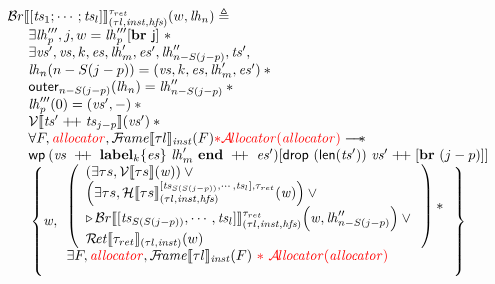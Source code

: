 \documentclass{standalone}
\begin{document}
\[
\begin{array}{l}
  \BRvalid \llbracket [\V{ts}_1; \cdots; \V{ts}_l] \rrbracket_{(\tau l, \V{inst}, \V{hfs})}^{\tau_{ret}}(w,\V{lh}_n) \triangleq
\\
  \quad
  \begin{array}{l}
    \exists \V{lh}'''_{p},j, w = \V{lh}'''_{p}[\K{\textbf{br }j}]~ \ast
  \\
    \exists \V{vs}',\V{vs}, k, \V{es}, \V{lh}'_m, \V{es}', \V{lh}''_{n - S(j - p)}, \V{ts}',
  \\
    \V{lh}_n(n - S(j - p)) = (\V{vs},k,\V{es},\V{lh}'_m,\V{es}') \ast {}
  \\
    \K{outer}_{n - S(j - p)}(\V{lh}_n) = \V{lh}''_{n - S(j - p)} \ast {}
  \\
    \V{lh}'''_p(0) = (\V{vs}',-) \ast {}
  \\
    \Vvalid\llbracket \V{ts}' \app \V{ts}_{j - p} \rrbracket(\V{vs}') \ast {}
  \\
    \forall F, \rr{\V{allocator}}, \FRvalid\llbracket \tau l \rrbracket_{\V{inst}}(F) \rr{\ast{} \Avalid(\V{allocator})} \wand
  \\
    \wprectxml{\V{vs}}{k}{\V{es}}{\V{lh}_{m}'}{\V{es'}}{\K{drop}~(\K{len}(\V{ts}'))~\V{vs}' \app [\KK{br}~(j - p)]}
	{\V{w},
        \begin{array}{l}
          \left(
          \begin{array}{l}
          (\exists \tau s, \Vvalid \llbracket \tau s \rrbracket(\V{w})) \vee {} \\
          \left( \exists \tau s, \Hvalid \llbracket \tau s \rrbracket_{(\tau l, \V{inst}, \V{hfs})}^{[\V{ts}_{S(S(j - p))}, \cdots, \V{ts}_l], \tau_{ret}}(\V{w}) \right) \vee {} \\
	  \later \BRvalid \llbracket [\V{ts}_{S(S(j - p))}, \cdots, \V{ts}_l] \rrbracket_{(\tau l, \V{inst},\V{hfs})}^{\tau_{ret}}{ \left( \V{w},\V{lh}''_{n - S(j - p)} \right) } \vee {}
	  \\
	  \Rvalid \llbracket \tau_{ret} \rrbracket_{(\tau l, \V{inst})}(w)
	  \end{array}
	  \right) \ast {}
	\\
	  \exists F, \rr{\V{allocator}}, \FRvalid\llbracket \tau l \rrbracket_{\V{inst}}(F)\rr{~\ast{}~ \Avalid(\V{allocator})}\\[1em]
	\end{array}}
  \end{array}
\end{array}
\]
\end{document}
